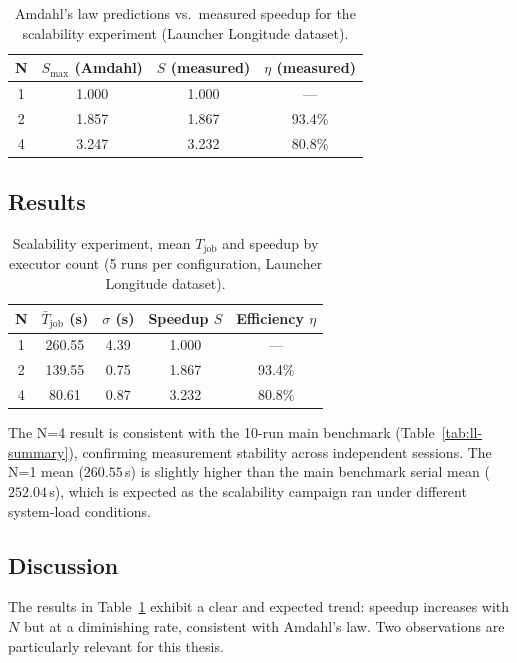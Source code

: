 \begin{table}[htbp]
\centering
\caption{Amdahl's law predictions vs.\ measured speedup for the scalability experiment
         (Launcher Longitude dataset).}
\label{tab:scalability-amdahl}
\begin{tabular}{cccc}
\toprule
N & $S_{\max}$ (Amdahl) & $S$ (measured) & $\eta$ (measured) \\
\midrule
1 & 1.000 & 1.000 & — \\
2 & 1.857 & 1.867 & 93.4\% \\
4 & 3.247 & 3.232 & 80.8\% \\
\bottomrule
\end{tabular}
\end{table}

\subsection{Results}
\label{subsec:eval-scalability-results}

\begin{table}[htbp]
\centering
\caption{Scalability experiment, mean $T_{\text{job}}$ and speedup by executor count
         (5 runs per configuration, Launcher Longitude dataset).}
\label{tab:scalability-results}
\begin{tabular}{ccccc}
\toprule
N & $\bar{T}_{\text{job}}$ (s) & $\sigma$ (s) & Speedup $S$ & Efficiency $\eta$ \\
\midrule
1 & 260.55 & 4.39 & 1.000 & — \\
2 & 139.55 & 0.75 & 1.867 & 93.4\% \\
4 & 80.61  & 0.87 & 3.232 & 80.8\% \\
\bottomrule
\end{tabular}
\end{table}

\noindent The N=4 result is consistent with the 10-run main benchmark
(Table~\ref{tab:ll-summary}), confirming measurement stability across independent
sessions.  The N=1 mean ($260.55$\,s) is slightly higher than the main benchmark
serial mean ($252.04$\,s), which is expected as the scalability campaign ran under
different system-load conditions.

\subsection{Discussion}
\label{subsec:eval-scalability-discussion}

The results in Table~\ref{tab:scalability-amdahl} exhibit a clear and expected trend:
speedup increases with $N$ but at a diminishing rate, consistent with Amdahl's law.
Two observations are particularly relevant for this thesis.

